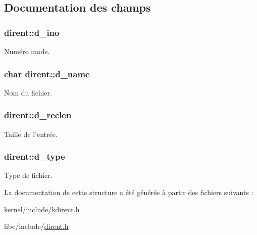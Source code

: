 \subsection{Documentation des champs}
\hypertarget{structdirent_a0ed2e5ea3c71500f628914bf3966e4ba}{
\subsubsection[{d\-\_\-ino}]{ dirent\-::d\-\_\-ino}}\label{structdirent_a0ed2e5ea3c71500f628914bf3966e4ba}
Numéro inode. \hypertarget{structdirent_a4325a83c49c6f2cd01ef80e1ae1dd4c5}{
\subsubsection[{d\-\_\-name}]{\setlength{\rightskip}{0pt plus 5cm}char dirent\-::d\-\_\-name}}\label{structdirent_a4325a83c49c6f2cd01ef80e1ae1dd4c5}
Nom du fichier. \hypertarget{structdirent_a7cc67dd4ba5a8bed7f107f249957688d}{
\subsubsection[{d\-\_\-reclen}]{ dirent\-::d\-\_\-reclen}}\label{structdirent_a7cc67dd4ba5a8bed7f107f249957688d}
Taille de l'entrée. \hypertarget{structdirent_a948760e3b7f607213a19f85e7af15a32}{
\subsubsection[{d\-\_\-type}]{ dirent\-::d\-\_\-type}}\label{structdirent_a948760e3b7f607213a19f85e7af15a32}
Type de fichier. 

La documentation de cette structure a été générée à partir des fichiers suivants \-:\begin{DoxyCompactItemize}
\item 
kernel/include/\hyperlink{kdirent_8h}{kdirent.\-h}\item 
libc/include/\hyperlink{dirent_8h}{dirent.\-h}\end{DoxyCompactItemize}
